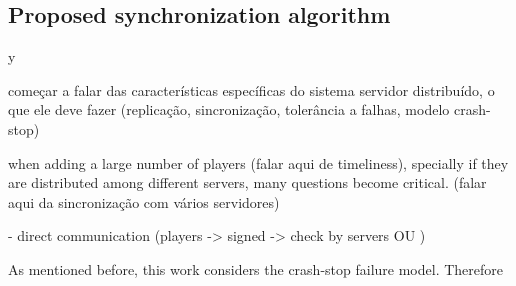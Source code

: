 \documentclass[]{usiinfprospectus}
\begin{document}



\subsection{Proposed synchronization algorithm} \label{sec:algorithm}

y


começar a falar das características específicas do sistema servidor distribuído, o que ele deve fazer (replicação, sincronização, tolerância a falhas, modelo crash-stop)

when adding a large number of players (falar aqui de timeliness), specially if they are distributed among different servers, many questions become critical. (falar aqui da sincronização com vários servidores)

- direct communication (players -> signed -> check by servers OU )


As mentioned before, this work considers the crash-stop failure model. Therefore



\end{document}
